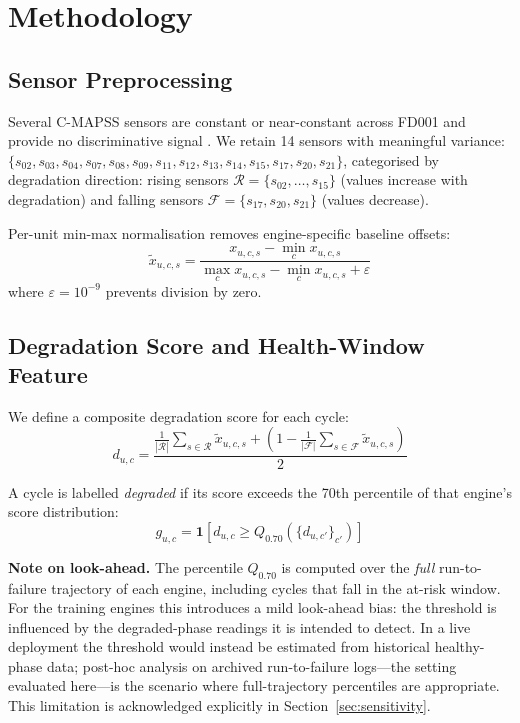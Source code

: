 \documentclass[10pt,twocolumn]{article}
\begin{document}
\section{Methodology}
\label{sec:method}

\subsection{Sensor Preprocessing}

Several C-MAPSS sensors are constant or near-constant across FD001 and provide no
discriminative signal \cite{ramasso2014application}.
We retain 14 sensors with meaningful variance:
$\{s_{02},s_{03},s_{04},s_{07},s_{08},s_{09},s_{11},s_{12},s_{13},s_{14},s_{15},s_{17},s_{20},s_{21}\}$,
categorised by degradation direction:
rising sensors $\mathcal{R}=\{s_{02},\ldots,s_{15}\}$ (values increase with degradation)
and falling sensors $\mathcal{F}=\{s_{17},s_{20},s_{21}\}$ (values decrease).

Per-unit min-max normalisation removes engine-specific baseline offsets:
\begin{equation}
  \tilde{x}_{u,c,s}=
  \frac{x_{u,c,s}-\min_c x_{u,c,s}}
       {\max_c x_{u,c,s}-\min_c x_{u,c,s}+\varepsilon}
\end{equation}
where $\varepsilon=10^{-9}$ prevents division by zero.

\subsection{Degradation Score and Health-Window Feature}

We define a composite degradation score for each cycle:
\begin{equation}
  d_{u,c}=
  \frac{
    \tfrac{1}{|\mathcal{R}|}\!\sum_{s\in\mathcal{R}}\tilde{x}_{u,c,s}
    +\!\left(1-\tfrac{1}{|\mathcal{F}|}\!\sum_{s\in\mathcal{F}}\tilde{x}_{u,c,s}\right)
  }{2}
\end{equation}

A cycle is labelled \emph{degraded} if its score exceeds the 70th percentile of that
engine's score distribution:
\begin{equation}
  g_{u,c}=\mathbf{1}\!\left[d_{u,c}\geq Q_{0.70}(\{d_{u,c'}\}_{c'})\right]
\end{equation}

\noindent\textbf{Note on look-ahead.}
The percentile $Q_{0.70}$ is computed over the \emph{full} run-to-failure trajectory
of each engine, including cycles that fall in the at-risk window.
For the training engines this introduces a mild look-ahead bias: the threshold
is influenced by the degraded-phase readings it is intended to detect.
In a live deployment the threshold would instead be estimated from historical
healthy-phase data; post-hoc analysis on archived run-to-failure logs---the setting
evaluated here---is the scenario where full-trajectory percentiles are appropriate.
This limitation is acknowledged explicitly in Section~\ref{sec:sensitivity}.
\end{document}
